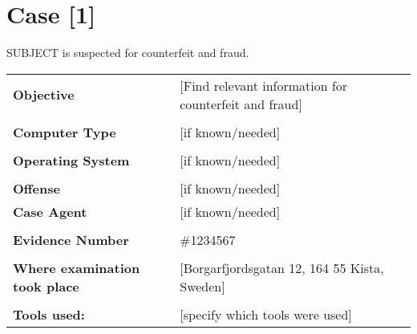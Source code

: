 \setlength\headsep{10pt}
\section{Case [1]}

SUBJECT is suspected for counterfeit and fraud.  


\begin{longtable}{p{}p{}}
\textbf{Objective} & [Find relevant information for counterfeit and fraud]\\
&\\
\textbf{Computer Type} & [if known/needed]\\
&\\
\textbf{Operating System} & [if known/needed]\\
&\\
\textbf{Offense} & [if known/needed]\\
\textbf{Case Agent} & [if known/needed]\\
&\\
\textbf{Evidence Number} &  \#1234567\\
&\\
\textbf{Where examination took place} &  [Borgarfjordsgatan 12, 164 55 Kista, Sweden] \\
&\\
\textbf{Tools used:} & [specify which tools were used]  
\end{longtable}

\newpage
